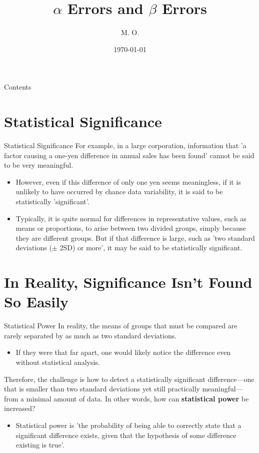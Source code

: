 \documentclass[dvipdfmx, autodetect-engine, aspectratio=169, 10.5pt]{beamer}
\title{$\alpha$ Errors and $\beta$ Errors}
\author{M. O.}
\date{\today}
\begin{document}
\begin{frame}[plain]
	\titlepage
\end{frame}

\begin{frame}{Contents}
	\tableofcontents
\end{frame}

\section{Statistical Significance}

\begin{frame}{Statistical Significance}
	For example, in a large corporation, information that 'a factor causing a one-yen difference in annual sales has been found' cannot be said to be very meaningful.
	\begin{itemize}
		\item However, even if this difference of only one yen seems meaningless, if it is unlikely to have occurred by chance data variability, it is said to be statistically 'significant'.
		\item Typically, it is quite normal for differences in representative values, such as means or proportions, to arise between two divided groups, simply because they are different groups. But if that difference is large, such as 'two standard deviations ($\pm$ 2SD) or more', it may be said to be statistically significant.
	\end{itemize}
\end{frame}

\section{In Reality, Significance Isn't Found So Easily}

\begin{frame}{Statistical Power}
	In reality, the means of groups that must be compared are rarely separated by as much as two standard deviations.
	\begin{itemize}
		\item If they were that far apart, one would likely notice the difference even without statistical analysis.
	\end{itemize}
	Therefore, the challenge is how to detect a statistically significant difference—one that is smaller than two standard deviations yet still practically meaningful—from a minimal amount of data. In other words, how can \textbf{statistical power} be increased?
	\begin{itemize}
		\item Statistical power is 'the probability of being able to correctly state that a significant difference exists, given that the hypothesis of some difference existing is true'.
	\end{itemize}
\end{frame}
\end{document}
